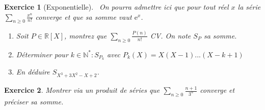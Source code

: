 \documentclass[12pt,a4paper]{article}
\newcommand{\R}{\mathbb{R}}
\newcommand{\N}{\mathbb{N}}
\theoremstyle{break}
\newtheorem{Exo}{Exercice}
\begin{document}
%



\begin{Exo}[Exponentielle]
\ 
On pourra admettre ici que pour tout réel $x$ la série  $\sum_{n\geqslant 0} \frac{x^n}{n!}$ converge et que sa somme vaut $\mathrm{e}^x$.
\begin{enumerate}
\item Soit $P \in \R[X]$, montrez que $\displaystyle\sum_{n\geqslant 0}\frac{P(n)}{n!}$ CV. On note $S_P$ sa somme.
\item Déterminer pour $k\in \N^*: S_{P_k}$ avec $P_k(X)=X(X-1)...(X-k+1)$
\item En déduire $S_{X^3+3X^2-X+2}$.
\end{enumerate}
\end{Exo}

%	
%			
%

\begin{Exo}
	Montrer via un produit de séries que $\displaystyle\sum_{n\geqslant 0} \frac{n+1}{3^n}$ converge et préciser sa somme.
\end{Exo}
\end{document}

